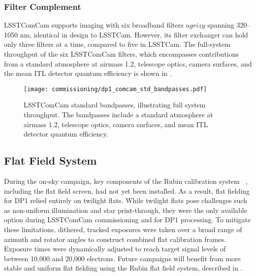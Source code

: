 \subsubsection{Filter Complement}
\label{sssec:comcam_filters}
\gls{LSSTComCam} supports imaging with six broadband filters $ugrizy$ spanning 320–1050 nm, identical in design to \gls{LSSTCam}.
However, its filter exchanger can hold only three filters at a time, compared to five in \gls{LSSTCam}.
The full-system throughput of the six \gls{LSSTComCam} filters, which encompasses contributions from a standard atmosphere at airmass 1.2, telescope optics, camera surfaces, and the mean \gls{ITL} detector quantum efficiency is shown in .
\begin{figure}[htb!]
\centering
\texttt{[image: commissioning/dp1\_comcam\_std\_bandpasses.pdf]}
\caption{LSSTComCam standard bandpasses, illustrating full system throughput. The bandpasses include a standard atmosphere at airmass 1.2, telescope optics, camera surfaces, and mean \gls{ITL} detector quantum efficiency.}
\label{fig:comcam_standard_bandpasses}
\vspace{0.1cm}
\end{figure}

\subsection{Flat Field System
\label{ssec:flat_field_system}}
During the on-sky campaign, key components of the Rubin calibration system ~\citep{2022SPIE12182E..0RI}, including the flat field screen,
had not yet been installed.
As a result, flat fielding for \gls{DP1} relied entirely on twilight flats.
While twilight flats pose challenges such as non-uniform illumination and star print-through, they were the only available option during \gls{LSSTComCam} commissioning and for DP1 processing.
To mitigate these limitations, dithered, tracked exposures were taken over a broad range of azimuth and rotator angles to construct combined flat \gls{calibration} frames.
Exposure times were dynamically adjusted to reach target signal levels of between 10,000 and 20,000 electrons.
Future campaigns will benefit from more stable and uniform flat fielding using the Rubin flat field system, described in \citet{SITCOMTN-086}.

